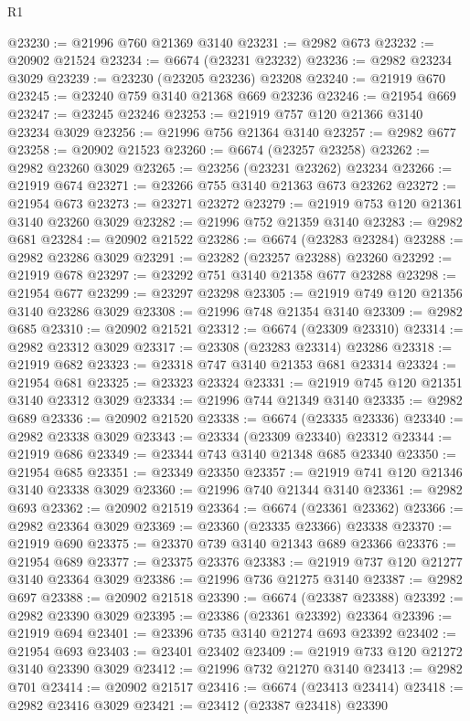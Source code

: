 \begin{lexlean}{R1}
\begin{coremodule}
@23230 := @21996 @760 @21369 @3140
@23231 := @2982 @673
@23232 := @20902 @21524
@23234 := @6674 (@23231 @23232)
@23236 := @2982 @23234 @3029
@23239 := @23230 (@23205 @23236) @23208
@23240 := @21919 @670
@23245 := @23240 @759 @3140 @21368 @669 @23236
@23246 := @21954 @669
@23247 := @23245 @23246
@23253 := @21919 @757 @120 @21366 @3140 @23234 @3029
@23256 := @21996 @756 @21364 @3140
@23257 := @2982 @677
@23258 := @20902 @21523
@23260 := @6674 (@23257 @23258)
@23262 := @2982 @23260 @3029
@23265 := @23256 (@23231 @23262) @23234
@23266 := @21919 @674
@23271 := @23266 @755 @3140 @21363 @673 @23262
@23272 := @21954 @673
@23273 := @23271 @23272
@23279 := @21919 @753 @120 @21361 @3140 @23260 @3029
@23282 := @21996 @752 @21359 @3140
@23283 := @2982 @681
@23284 := @20902 @21522
@23286 := @6674 (@23283 @23284)
@23288 := @2982 @23286 @3029
@23291 := @23282 (@23257 @23288) @23260
@23292 := @21919 @678
@23297 := @23292 @751 @3140 @21358 @677 @23288
@23298 := @21954 @677
@23299 := @23297 @23298
@23305 := @21919 @749 @120 @21356 @3140 @23286 @3029
@23308 := @21996 @748 @21354 @3140
@23309 := @2982 @685
@23310 := @20902 @21521
@23312 := @6674 (@23309 @23310)
@23314 := @2982 @23312 @3029
@23317 := @23308 (@23283 @23314) @23286
@23318 := @21919 @682
@23323 := @23318 @747 @3140 @21353 @681 @23314
@23324 := @21954 @681
@23325 := @23323 @23324
@23331 := @21919 @745 @120 @21351 @3140 @23312 @3029
@23334 := @21996 @744 @21349 @3140
@23335 := @2982 @689
@23336 := @20902 @21520
@23338 := @6674 (@23335 @23336)
@23340 := @2982 @23338 @3029
@23343 := @23334 (@23309 @23340) @23312
@23344 := @21919 @686
@23349 := @23344 @743 @3140 @21348 @685 @23340
@23350 := @21954 @685
@23351 := @23349 @23350
@23357 := @21919 @741 @120 @21346 @3140 @23338 @3029
@23360 := @21996 @740 @21344 @3140
@23361 := @2982 @693
@23362 := @20902 @21519
@23364 := @6674 (@23361 @23362)
@23366 := @2982 @23364 @3029
@23369 := @23360 (@23335 @23366) @23338
@23370 := @21919 @690
@23375 := @23370 @739 @3140 @21343 @689 @23366
@23376 := @21954 @689
@23377 := @23375 @23376
@23383 := @21919 @737 @120 @21277 @3140 @23364 @3029
@23386 := @21996 @736 @21275 @3140
@23387 := @2982 @697
@23388 := @20902 @21518
@23390 := @6674 (@23387 @23388)
@23392 := @2982 @23390 @3029
@23395 := @23386 (@23361 @23392) @23364
@23396 := @21919 @694
@23401 := @23396 @735 @3140 @21274 @693 @23392
@23402 := @21954 @693
@23403 := @23401 @23402
@23409 := @21919 @733 @120 @21272 @3140 @23390 @3029
@23412 := @21996 @732 @21270 @3140
@23413 := @2982 @701
@23414 := @20902 @21517
@23416 := @6674 (@23413 @23414)
@23418 := @2982 @23416 @3029
@23421 := @23412 (@23387 @23418) @23390

\end{coremodule}
\end{lexlean}
